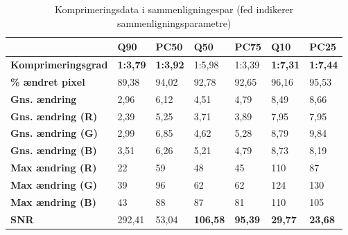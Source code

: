 \begin{table}[htbp]
\centering
\begin{tabular}{|l|ll|ll|ll|} \hline
                    & \multicolumn{1}{l|}{\textbf{Q90}} & \textbf{PC50}   &  \multicolumn{1}{l|}{\textbf{Q50}} & \textbf{PC75}   & \multicolumn{1}{l|}{\textbf{Q10}} & \textbf{PC25}   \\ \hline
\textbf{Komprimeringsgrad}   & \textbf{1:3,79}  & \textbf{1:3,92} & 1:5,98                   & 1:3,39 & \textbf{1:7,31}                   & \textbf{1:7,44} \\ 
\textbf{\% ændret pixel}     & 89,38                    & 94,02  & 92,78                    & 92,65  & 96,16                    & 95,53  \\ \hline
\textbf{Gns. ændring}        & 2,96                     & 6,12   & 4,51                     & 4,79   & 8,49                     & 8,66   \\
\textbf{Gns. ændring (R)}   & 2,39                     & 5,25   & 3,71                     & 3,89   & 7,95                     & 7,95   \\
\textbf{Gns. ændring (G)}  & 2,99                     & 6,85   & 4,62                     & 5,28   & 8,79                     & 9,84   \\
\textbf{Gns. ændring (B)}   & 3,51                     & 6,26  & 5,21                     & 4,79   & 8,73                     & 8,19   \\ \hline
\textbf{Max ændring (R)}   & 22                       & 59     & 48                       & 45     & 110                      & 87     \\
\textbf{Max ændring (G)}  & 39                       & 96     & 62                       & 62     & 124                      & 130    \\
\textbf{Max ændring (B)}   & 43                       & 88     & 87                       & 81     & 110                      & 105    \\ \hline
\textbf{SNR}                 & 292,41                   & 53,04  & \textbf{106,58}                   & \textbf{95,39}  & \textbf{29,77}                    & \textbf{23,68}  \\ \hline
\end{tabular}
\caption{Komprimeringsdata i sammenligningespar (fed indikerer sammenligningsparametre)}
\label{tb:sammenligning}
\end{table}



